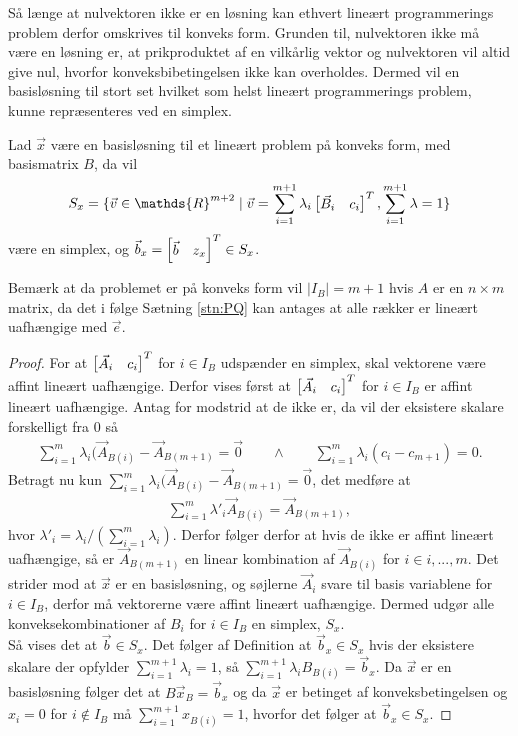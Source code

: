 Så længe at nulvektoren ikke er en løsning kan ethvert lineært programmerings problem derfor omskrives til konveks form.
Grunden til, nulvektoren ikke må være en løsning er, at prikproduktet af en vilkårlig vektor og nulvektoren vil altid give nul, hvorfor konveksbibetingelsen ikke kan overholdes.
Dermed vil en basisløsning til stort set hvilket som helst lineært programmerings problem, kunne repræsenteres ved en simplex.
\begin{stn}
Lad $\vec{x}$ være en basisløsning til et lineært problem på konveks form, med basismatrix $B$, da vil
\begin{align*}
S_x = \{\vec{v} \in \mathds{R}^{m+2} \mid \vec{v} = \sum_{i=1}^{m+1} \lambda_i \rvect{\vec{B}_i & c_i}^T, \sum_{i=1}^{m+1} \lambda = 1\}
\end{align*}
være en simplex, og $\vec{b}_x = \begin{bmatrix} \vec{b}& z_x \end{bmatrix}^T \in S_x$.
\end{stn}
Bemærk at da problemet er på konveks form vil $|I_B| = m+1$ hvis $A$ er en $n\times m$ matrix, da det i følge Sætning \ref{stn:PQ}
kan antages at alle rækker er lineært uafhængige med $\vec{e}$.
\begin{proof}
For at $\begin{bmatrix} \vec{A}_i & c_i \end{bmatrix}^T$ for $i \in I_B$ udspænder en simplex, skal vektorene være affint lineært uafhængige.
Derfor vises først at $\begin{bmatrix} \vec{A}_i & c_i \end{bmatrix}^T$ for $i \in I_B$ er affint lineært uafhængige.
Antag for modstrid at de ikke er, da vil der eksistere skalare forskelligt fra $0$ så
\begin{align*}
\sum_{i = 1}^{m} \lambda_i (\vec{A}_{B(i)} - \vec{A}_{B(m+1)} =  \vec{0} \qquad \wedge \qquad \sum_{i=1}^{m} \lambda_i (c_i - c_{m+1})= 0.
\end{align*}
Betragt nu kun $\sum_{i = 1}^{m} \lambda_i (\vec{A}_{B(i)} - \vec{A}_{B(m+1)} =  \vec{0}$, det medføre at
\begin{align*}
\sum_{i = 1}^{m} \lambda'_i \vec{A}_{B(i)} = \vec{A}_{B(m+1)},
\end{align*}
hvor $\lambda'_i = \lambda_i/(\sum_{i=1}^m \lambda_i)$.
Derfor følger derfor at hvis de ikke er affint lineært uafhængige, så er $\vec{A}_{B(m+1)}$ en linear kombination af $\vec{A}_{B(i)}$ for $i  \in i,..., m$.
Det strider mod at $\vec{x}$ er en basisløsning, og søjlerne $\vec{A}_i$ svare til basis variablene for $i \in I_B$, derfor må vektorerne være affint lineært uafhængige. 
Dermed udgør alle konveksekombinationer af $B_i$ for $i \in I_B$ en simplex, $S_x$.
\\ Så vises det at $\vec{b} \in S_x$. 
Det følger af Definition
at $\vec{b}_x\in S_x$ hvis der eksistere skalare der opfylder $\sum_{i=1}^{m+1} \lambda_i = 1$, så $\sum_{i=1}^{m+1}\lambda_i B_{B(i)}  = \vec{b}_x$.
Da $\vec{x}$ er en basisløsning følger det at $B \vec{x}_B = \vec{b}_x$ og da $\vec{x}$ er betinget af konveksbetingelsen og $x_i = 0 $ for $i \notin I_B$ må $\sum_{i=1}^{m+1} x_{B(i)} = 1$, hvorfor det følger at $\vec{b}_x \in S_x$.
\end{proof}
